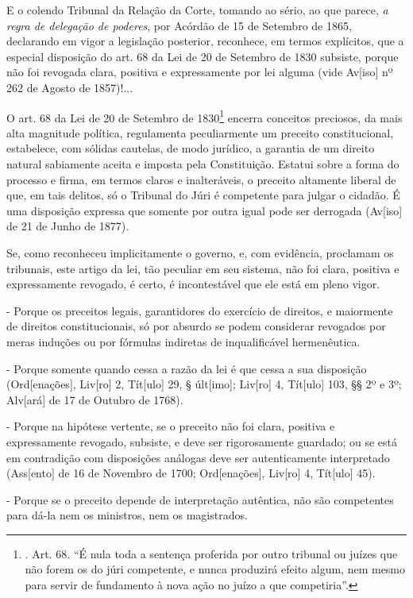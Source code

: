 E o colendo Tribunal da Relação da Corte, tomando ao sério, ao que
parece, \emph{a regra de delegação de poderes}, por Acórdão de 15 de
Setembro de 1865, declarando em vigor a legislação posterior, reconhece,
em termos explícitos, que a especial disposição do art. 68 da Lei de 20
de Setembro de 1830 subsiste, porque não foi revogada clara, positiva e
expressamente por lei alguma (vide Av{[}iso{]} nº 262 de Agosto de
1857)!...

O art. 68 da Lei de 20 de Setembro de 1830\footnote{. Art. 68. ``É nula
  toda a sentença proferida por outro tribunal ou juízes que não forem
  os do júri competente, e nunca produzirá efeito algum, nem mesmo para
  servir de fundamento à nova ação no juízo a que competiria''.} encerra
conceitos preciosos, da mais alta magnitude política, regulamenta
peculiarmente um preceito constitucional, estabelece, com sólidas
cautelas, de modo jurídico, a garantia de um direito natural sabiamente
aceita e imposta pela Constituição. Estatui sobre a forma do processo e
firma, em termos claros e inalteráveis, o preceito altamente liberal de
que, em tais delitos, só o Tribunal do Júri é competente para julgar o
cidadão. É uma disposição expressa que somente por outra igual pode ser
derrogada (Av{[}iso{]} de 21 de Junho de 1877).

Se, como reconheceu implicitamente o governo, e, com evidência,
proclamam os tribunais, este artigo da lei, tão peculiar em seu sistema,
não foi clara, positiva e expressamente revogado, é certo, é
incontestável que ele está em pleno vigor.

- Porque os preceitos legais, garantidores do exercício de direitos, e
maiormente de direitos constitucionais, só por absurdo se podem
considerar revogados por meras induções ou por fórmulas indiretas de
inqualificável hermenêutica.

- Porque somente quando cessa a razão da lei é que cessa a sua
disposição (Ord{[}enações{]}, Liv{[}ro{]} 2, Tít{[}ulo{]} 29, §
últ{[}imo{]}; Liv{[}ro{]} 4, Tít{[}ulo{]} 103, §§ 2º e 3º; Alv{[}ará{]}
de 17 de Outubro de 1768).

- Porque na hipótese vertente, se o preceito não foi clara, positiva e
expressamente revogado, subsiste, e deve ser rigorosamente guardado; ou
se está em contradição com disposições análogas deve ser autenticamente
interpretado (Ass{[}ento{]} de 16 de Novembro de 1700; Ord{[}enações{]},
Liv{[}ro{]} 4, Tít{[}ulo{]} 45).

- Porque se o preceito depende de interpretação autêntica, não são
competentes para dá-la nem os ministros, nem os magistrados.

